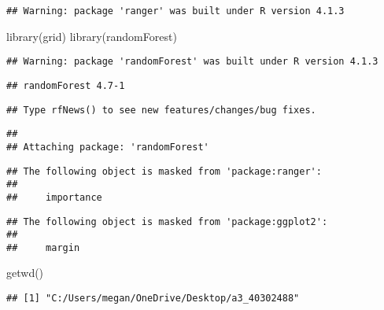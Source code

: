 \documentclass[
]{article}
\newenvironment{Shaded}{\begin{snugshade}}{\end{snugshade}}
\newcommand{\FunctionTok}[1]{\textcolor[rgb]{0.00,0.00,0.00}{#1}}
\newcommand{\NormalTok}[1]{#1}
\begin{document}
\begin{verbatim}
## Warning: package 'ranger' was built under R version 4.1.3
\end{verbatim}

\begin{Shaded}
\begin{Highlighting}[]
\FunctionTok{library}\NormalTok{(grid)}
\FunctionTok{library}\NormalTok{(randomForest)}
\end{Highlighting}
\end{Shaded}

\begin{verbatim}
## Warning: package 'randomForest' was built under R version 4.1.3
\end{verbatim}

\begin{verbatim}
## randomForest 4.7-1
\end{verbatim}

\begin{verbatim}
## Type rfNews() to see new features/changes/bug fixes.
\end{verbatim}

\begin{verbatim}
## 
## Attaching package: 'randomForest'
\end{verbatim}

\begin{verbatim}
## The following object is masked from 'package:ranger':
## 
##     importance
\end{verbatim}

\begin{verbatim}
## The following object is masked from 'package:ggplot2':
## 
##     margin
\end{verbatim}

\begin{Shaded}
\begin{Highlighting}[]
\FunctionTok{getwd}\NormalTok{()}
\end{Highlighting}
\end{Shaded}

\begin{verbatim}
## [1] "C:/Users/megan/OneDrive/Desktop/a3_40302488"
\end{verbatim}
\end{document}

